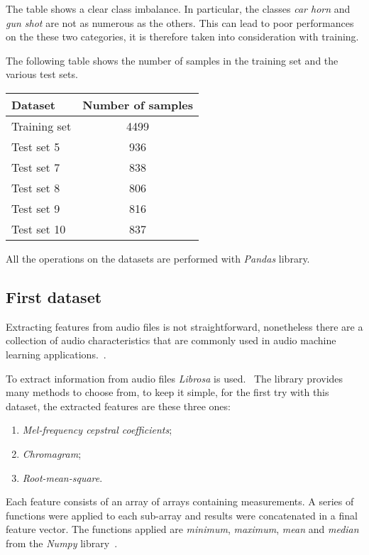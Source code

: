 The table shows a clear class imbalance. In particular, the classes 
\emph{car horn} and \emph{gun shot} are not as numerous as the others. 
This can lead to poor performances on the these two categories, it is
therefore taken 
into consideration with training. 

The following table shows the number of samples in the training set and 
the various test sets.

\begin{center}
    \begin{tabular}{ |l|c| } 
        \hline
        Dataset & Number of samples \\
        \hline
        Training set & 4499 \\
        Test set 5 & 936 \\
        Test set 7 & 838 \\
        Test set 8 & 806 \\
        Test set 9 & 816 \\
        Test set 10 & 837 \\
        \hline
    \end{tabular}
\end{center}
All the operations on the datasets are performed with \emph{Pandas} library.~\cite{pandas}

\subsection{First dataset}
Extracting features from audio files is not straightforward, nonetheless there 
are a collection of audio characteristics that are commonly used in audio machine learning 
applications.~\cite{features}.

To extract information from audio files \emph{Librosa} is used.~\cite{librosa}
The library provides many methods to choose from,
to keep it simple, for the first try with this dataset, the extracted features 
are these three ones: 
\begin{enumerate}
    \item \emph{Mel-frequency cepstral coefficients};
    \item \emph{Chromagram};
    \item \emph{Root-mean-square}.
\end{enumerate}
Each feature consists of an array of arrays containing measurements. 
A series of functions were applied to each sub-array and results 
were concatenated in a final feature vector. 
The functions applied are \emph{minimum}, \emph{maximum}, \emph{mean} 
and \emph{median} from the \emph{Numpy} library~\cite{numpy}.

